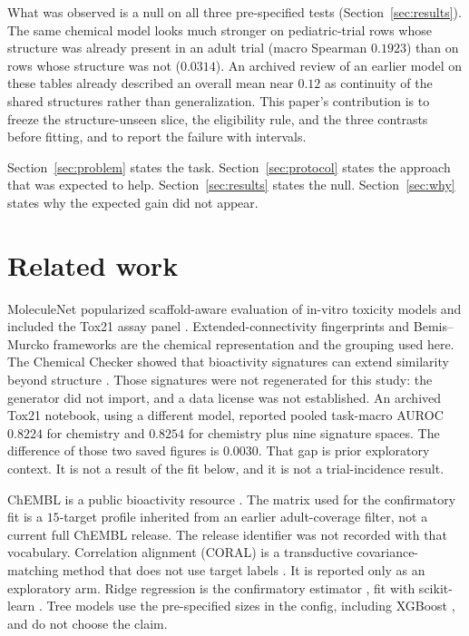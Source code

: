 \documentclass[10pt]{article}
\begin{document}
What was observed is a null on all three pre-specified tests (Section~\ref{sec:results}).
The same chemical model looks much stronger on pediatric-trial rows whose structure was already present in an adult trial (macro Spearman $0.1923$) than on rows whose structure was not ($0.0314$).
An archived review of an earlier model on these tables already described an overall mean near $0.12$ as continuity of the shared structures rather than generalization.
This paper's contribution is to freeze the structure-unseen slice, the eligibility rule, and the three contrasts before fitting, and to report the failure with intervals.

Section~\ref{sec:problem} states the task.
Section~\ref{sec:protocol} states the approach that was expected to help.
Section~\ref{sec:results} states the null.
Section~\ref{sec:why} states why the expected gain did not appear.

\section{Related work}
\label{sec:related}

MoleculeNet popularized scaffold-aware evaluation of in-vitro toxicity models and included the Tox21 assay panel \citep{wu2018moleculenet,tice2013tox21}.
Extended-connectivity fingerprints \citep{rogers2010ecfp} and Bemis--Murcko frameworks \citep{bemis1996frameworks} are the chemical representation and the grouping used here.
The Chemical Checker showed that bioactivity signatures can extend similarity beyond structure \citep{duranfrigola2020chemicalchecker}.
Those signatures were not regenerated for this study: the generator did not import, and a data license was not established.
An archived Tox21 notebook, using a different model, reported pooled task-macro AUROC $0.8224$ for chemistry and $0.8254$ for chemistry plus nine signature spaces.
The difference of those two saved figures is $0.0030$.
That gap is prior exploratory context.
It is not a result of the fit below, and it is not a trial-incidence result.

ChEMBL is a public bioactivity resource \citep{zdrazil2024chembl}.
The matrix used for the confirmatory fit is a $15$-target profile inherited from an earlier adult-coverage filter, not a current full ChEMBL release.
The release identifier was not recorded with that vocabulary.
Correlation alignment (CORAL) is a transductive covariance-matching method that does not use target labels \citep{sun2016coral}.
It is reported only as an exploratory arm.
Ridge regression is the confirmatory estimator \citep{hoerl1970ridge}, fit with scikit-learn \citep{pedregosa2011sklearn}.
Tree models use the pre-specified sizes in the config, including XGBoost \citep{chen2016xgboost}, and do not choose the claim.
\end{document}
